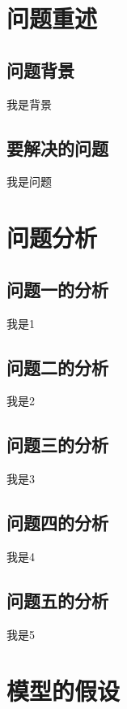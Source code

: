 \documentclass[UTF8,12pt]{ctexart}
\begin{document}
	
	\section{问题重述}
	
	\subsection{问题背景}
	
	我是背景
	
	\subsection{要解决的问题}
	
	我是问题
	
	\section{问题分析}
	
	\subsection{问题一的分析}
	
	我是1
	
	\subsection{问题二的分析}
	
	我是2
	
	\subsection{问题三的分析}
	
	我是3
	
	\subsection{问题四的分析}
	
	我是4
	
	\subsection{问题五的分析}
	
	我是5
	
	
	
	\section{模型的假设}
	
\end{document}
